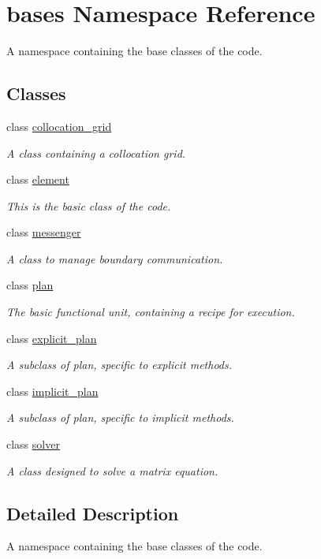 \hypertarget{namespacebases}{\section{bases Namespace Reference}
\label{namespacebases}
}


A namespace containing the base classes of the code.  


\subsection*{Classes}
\begin{DoxyCompactItemize}
\item 
class \hyperlink{classbases_1_1collocation__grid}{collocation\-\_\-grid}
\begin{DoxyCompactList}\small\item\em A class containing a collocation grid. \end{DoxyCompactList}\item 
class \hyperlink{classbases_1_1element}{element}
\begin{DoxyCompactList}\small\item\em This is the basic class of the code. \end{DoxyCompactList}\item 
class \hyperlink{classbases_1_1messenger}{messenger}
\begin{DoxyCompactList}\small\item\em A class to manage boundary communication. \end{DoxyCompactList}\item 
class \hyperlink{classbases_1_1plan}{plan}
\begin{DoxyCompactList}\small\item\em The basic functional unit, containing a recipe for execution. \end{DoxyCompactList}\item 
class \hyperlink{classbases_1_1explicit__plan}{explicit\-\_\-plan}
\begin{DoxyCompactList}\small\item\em A subclass of plan, specific to explicit methods. \end{DoxyCompactList}\item 
class \hyperlink{classbases_1_1implicit__plan}{implicit\-\_\-plan}
\begin{DoxyCompactList}\small\item\em A subclass of plan, specific to implicit methods. \end{DoxyCompactList}\item 
class \hyperlink{classbases_1_1solver}{solver}
\begin{DoxyCompactList}\small\item\em A class designed to solve a matrix equation. \end{DoxyCompactList}\end{DoxyCompactItemize}


\subsection{Detailed Description}
A namespace containing the base classes of the code. 

 